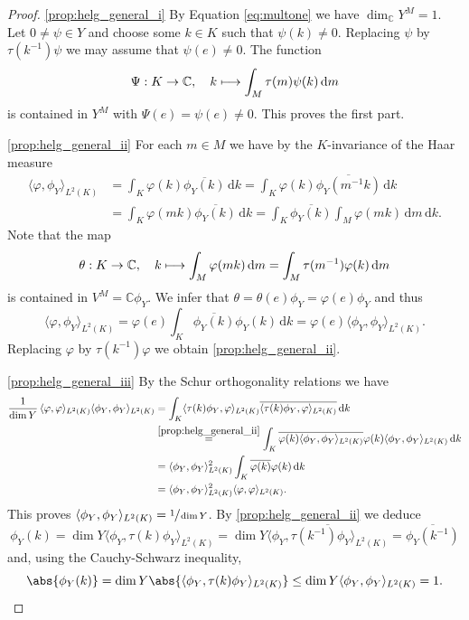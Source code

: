 \documentclass[JEP,XML,SOM,NoFloatCountersInSection,Unicode,published]{cedram}
\newcommand\mto{\mathchoice{\longmapsto}{\mapsto}{\mapsto}{\mapsto}}
\theoremstyle{definition}
\DeclarePairedDelimiter{\abs}\lvert\rvert
\newcommand{\on}[1]{\ensuremath{\operatorname{#1}}}
\newcommand{\C}{\ensuremath{\mathbb{C}}}
\newcommand{\intd}{\ensuremath{\,\mathrm{d}}}
\newcommand{\ov}[1]{\ensuremath{\overline{#1}}}
\begin{document}
\skpt
\begin{proof}
\eqref{prop:helg_general_i} By Equation \eqref{eq:multone} we have $\dim_\C Y^M=1$. Let $0\neq\psi\in Y$ and choose some $k\in K$ such that $\psi(k)\neq0$. Replacing $\psi$ by $\tau(k^{-1})\psi$ we may assume that $\psi(e)\neq0$. The function
\[
\Psi:K\to\C,\quad k\mto\int_M\tau(m)\psi(k)\intd m
\]
is contained in $Y^M$ with $\Psi(e)=\psi(e)\neq0$. This proves the first part.\par
\eqref{prop:helg_general_ii} For each $m\in M$ we have by the $K$-invariance of the Haar measure
\begin{align*}
\langle\varphi,\phi_Y\rangle_{L^2(K)}&=\int_{K}\varphi(k)\ov{\phi_Y(k)}\intd k
=\int_{K}\varphi(k)\ov{\phi_Y(m^{-1}k)}\intd k\\
&=\int_{K}\varphi(mk)\ov{\phi_Y(k)}\intd k
=\int_{K}\ov{\phi_Y(k)}\int_M\varphi(mk)\intd m\intd k.
\end{align*}
Note that the map
\[
\theta:K\to\C,\quad k\mto\int_M\varphi(mk)\intd m=\int_M\tau(m^{-1})\varphi(k)\intd m
\]
is contained in $V^M=\C\phi_Y$. We infer that $\theta=\theta(e)\phi_Y=\varphi(e)\phi_Y$ and thus
\[
\langle\varphi,\phi_Y\rangle_{L^2(K)}=\varphi(e)\int_{K}\ov{\phi_Y(k)}\phi_Y(k)\intd k=\varphi(e)\langle\phi_Y,\phi_Y\rangle_{L^2(K)}.
\]
Replacing $\varphi$ by $\tau(k^{-1})\varphi$ we obtain \eqref{prop:helg_general_ii}.\par
\eqref{prop:helg_general_iii} By the Schur orthogonality relations we have
\begin{align*}
\frac{1}{\on{dim}Y}\,\langle\varphi,\varphi\rangle_{L^2(K)}\langle\phi_Y,\phi_Y\rangle_{L^2(K)}&=\int_{K}\langle\tau(k)\phi_Y,\varphi\rangle_{L^2(K)}\ov{\langle\tau(k)\phi_Y,\varphi\rangle_{L^2(K)}}\intd k\\
&\stackrel{\eqref{prop:helg_general_ii}}{=}\int_{K}\ov{\varphi(k)\langle\phi_Y,\phi_Y\rangle_{L^2(K)}}\varphi(k)\langle\phi_Y,\phi_Y\rangle_{L^2(K)}\intd k\\
&=\langle\phi_Y,\phi_Y\rangle_{L^2(K)}^2\int_{K}\ov{\varphi(k)}\varphi(k)\intd k\\
&=\langle\phi_Y,\phi_Y\rangle_{L^2(K)}^2\langle\varphi,\varphi\rangle_{L^2(K)}.
\end{align*}
This proves $\langle\phi_Y,\phi_Y\rangle_{L^2(K)}=\sfrac{1}{\dim Y}$.
By \eqref{prop:helg_general_ii} we deduce
\[
\phi_Y(k)=\dim Y\langle\phi_Y,\tau(k)\phi_Y\rangle_{L^2(K)}=\dim Y\ov{\langle\phi_Y,\tau(k^{-1})\phi_Y\rangle_{L^2(K)}}=\ov{\phi_Y(k^{-1})}
\]
and, using the Cauchy-Schwarz inequality,
\[
\abs{\phi_Y(k)}=\dim Y\abs{\langle\phi_Y,\tau(k)\phi_Y\rangle_{L^2(K)}}\leq\dim Y\langle\phi_Y,\phi_Y\rangle_{L^2(K)}=1.\qedhere
\]
\end{proof}
\end{document}
